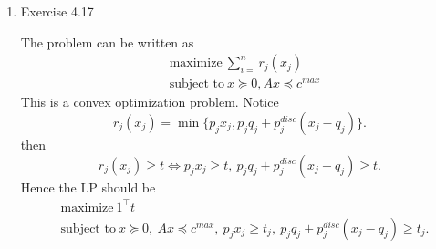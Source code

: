 \documentclass{article}%
\begin{document}
\begin{enumerate}
\item Exercise 4.17

The problem can be written as
$$
\begin{aligned}
&\text{maximize} ~\sum_{i=}^{n}r_j(x_j) \\
&\text{subject to} ~x\succcurlyeq 0, Ax\preccurlyeq c^{max}
\end{aligned}
$$
This is a convex optimization problem. Notice
$$
r_j(x_j) = \min\{p_jx_j, p_jq_j+p_j^{disc}(x_j-q_j)\}.
$$
then 
$$
r_j(x_j)\ge t \iff p_jx_j\ge t, ~p_jq_j + p_j^{disc}(x_j-q_j)\ge t.
$$
Hence the LP should be
$$
\begin{aligned}
&\text{maximize} ~1^\top t \\
&\text{subject to}~ x\succcurlyeq 0, ~Ax\preccurlyeq c^{max}, ~p_jx_j\ge t_j, ~p_jq_j + p_j^{disc}(x_j-q_j)\ge t_j.
\end{aligned}
$$

\end{enumerate}
\end{document}
